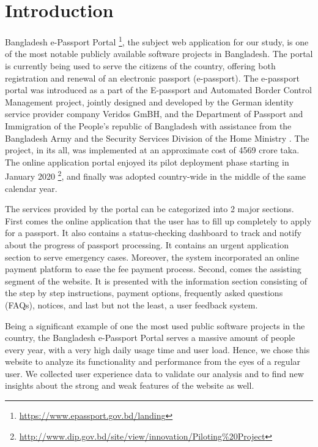 \section{Introduction}\label{sec:intro}
Bangladesh e-Passport Portal \footnote{\url{https://www.epassport.gov.bd/landing}}, the subject web application for our study, is one of the most notable publicly available software projects in Bangladesh. The portal is currently being used to serve the citizens of the country, offering both registration and renewal of an electronic passport (e-passport). The e-passport portal was introduced as a part of the E-passport and Automated Border Control Management project, jointly designed and developed by the German identity service provider company Veridos GmBH, and the Department of Passport and Immigration of the People’s republic of Bangladesh with assistance from the Bangladesh Army and the Security Services Division of the Home Ministry \cite{c21}. The project, in its all, was implemented at an approximate cost of 4569 crore taka. The online application portal enjoyed its pilot deployment phase starting in January 2020 \footnote{\url{http://www.dip.gov.bd/site/view/innovation/Piloting\%20Project}}, and finally was adopted country-wide in the middle of the same calendar year. 

The services provided by the portal can be categorized into 2 major sections. First comes the online application that the user has to fill up completely to apply for a passport. It also contains a status-checking dashboard to track and notify about the progress of passport processing. It contains an urgent application section to serve emergency cases. Moreover, the system incorporated an online payment platform to ease the fee payment process. Second, comes the assisting segment of the website. It is presented with the information section consisting of the step by step instructions, payment options, frequently asked questions (FAQs), notices, and last but not the least, a user feedback system.

Being a significant example of one the most used public software projects in the country, the Bangladesh e-Passport Portal serves a massive amount of people every year, with a very high daily usage time and user load. Hence, we chose this website to analyze its functionality and performance from the eyes of a regular user. We collected user experience data to validate our analysis and to find new insights about the strong and weak features of the website as well.
